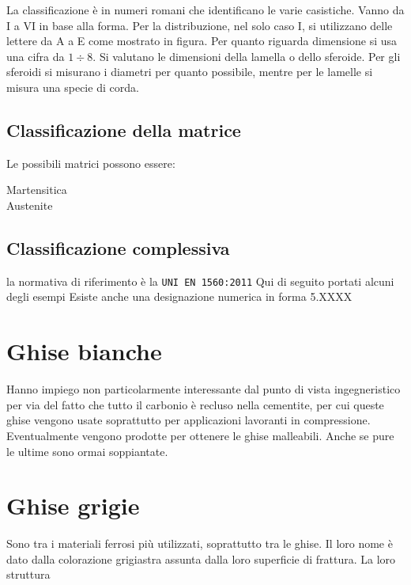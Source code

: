 La classificazione è in numeri romani che identificano le varie casistiche. Vanno da I a VI in base alla forma.
Per la distribuzione, nel solo caso I, si utilizzano delle lettere da A a E come mostrato in figura.
Per quanto riguarda dimensione si usa una cifra da $1 \div 8$. Si valutano 
le dimensioni della lamella o dello sferoide.
Per gli sferoidi si misurano i diametri per quanto possibile, mentre per le lamelle si misura una specie di corda.

\subsection{Classificazione della matrice}
Le possibili matrici possono essere:
\begin{description}
\item[Martensitica]
\item[Austenite]
\end{description}

\subsection{Classificazione complessiva}
la normativa di riferimento è la \texttt{UNI EN 1560:2011}
Qui di seguito portati alcuni degli esempi 
Esiste anche una designazione numerica in forma 5.XXXX

\section{Ghise bianche}
Hanno impiego non particolarmente interessante dal punto di vista ingegneristico per via del fatto che tutto il carbonio è recluso nella cementite, per cui queste ghise vengono usate soprattutto per applicazioni lavoranti in compressione.
Eventualmente vengono prodotte per ottenere le ghise malleabili. Anche se pure le ultime sono ormai soppiantate.

\section{Ghise grigie}
Sono tra i materiali ferrosi più utilizzati, soprattutto tra le ghise.
Il loro nome è dato dalla colorazione grigiastra assunta dalla loro superficie di frattura.
La loro struttura \todo{\\completa}

